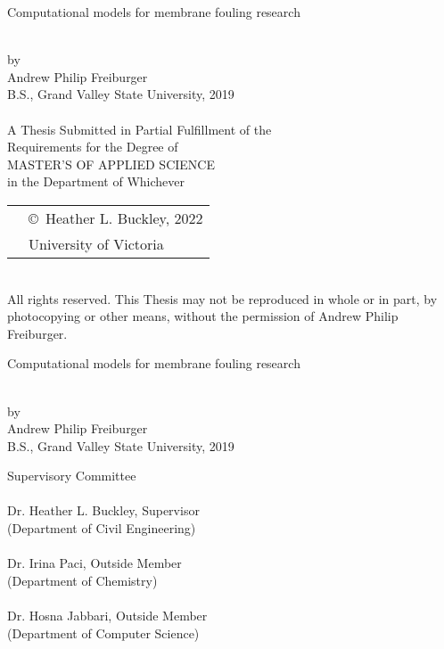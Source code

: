 \newcommand\thesistitle{
    Computational models for membrane fouling research
}
\newcommand\nameanddegrees{
Andrew Philip Freiburger\\
B.S., Grand Valley State University, 2019\\
}
\newcommand\panel{
    \HRule\\\panelist{Dr. Heather L. Buckley}{Supervisor}{Department of Civil Engineering}
    \HRule\\\panelist{Dr. Irina Paci}{Outside Member}{Department of Chemistry}
    \HRule\\\panelist{Dr. Hosna Jabbari}{Outside Member}{Department of Computer Science}
}

\newcommand\tpbreak{\\[\baselineskip]}
\newpage
\thispagestyle{empty}

\pagestyle{myheadings}

\pagebreak
{
    \centering
    \thesistitle
    \tpbreak
    
    by
    \tpbreak
    \nameanddegrees
    \tpbreak
    A Thesis Submitted in Partial Fulfillment of the \\
    Requirements for the Degree of
    \tpbreak
    MASTER'S OF APPLIED SCIENCE
    \tpbreak
    in the Department of Whichever\\
    \vfill
    \begin{tabular}{cl}
        & \copyright\ Heather L. Buckley, 2022\\
        & \phantom{\copyright} University of Victoria
    \end{tabular}
    \tpbreak
    All rights reserved. This Thesis may not be reproduced in whole or in part, by \\
    \hfill photocopying or other means, without the permission of Andrew Philip Freiburger. 
    \hfill
}
\pagebreak

\newpage
{}
{
    \centering
    \thesistitle
    \tpbreak
    by
    \tpbreak
    \nameanddegrees
}
\newcommand\panelist[3]{\noindent #1, #2\\\noindent(#3)\tpbreak}
\vfill
\noindent Supervisory Committee
\tpbreak
\panel
\vfill
\pagebreak

